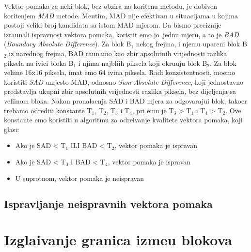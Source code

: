 Vektor pomaka za neki blok, bez obzira na kori\sh tenu metodu, je dobiven kori\sh tenjem \textit{MAD} metode. Me\dj utim, MAD nije efektivan u situacijama u kojima postoji veliki broj kandidata sa istom MAD mjerom.
Da bismo preciznije izra\ch unali ispravnost vektora pomaka, koristit \cj emo jo\sh\ jednu mjeru, a to je \textit{BAD} (\textit{Boundary Absolute Difference}). Za blok B$_1$ nekog frejma, i njemu upareni blok B$_2$ iz narednog
frejma, BAD ra\ch unamo kao zbir apsolutnih vrijednosti razlika piksela na ivici bloka B$_1$ i njima najbli\zh ih piksela koji okru\zh uju blok B$_2$. %
Za blok veli\ch ine 16x16 piksela, imat \cj emo 64 ivi\ch na piksela. Radi konzistentnosti, mo\zh emo koristiti \textit{SAD} umjesto MAD, odnosno \textit{Sum Absolute Difference}, koji jednostavno predstavlja ukupni zbir
apsolutnih vrijednosti razlika piksela, bez dijeljenja sa veli\ch inom bloka. Nakon pronala\zh enja SAD i BAD mjera za odgovaraju\cj i blok, tako\dj er trebamo odrediti konstante T$_1$, T$_2$, T$_3$ i T$_4$, pri \ch emu je T$_3$ > T$_1$ i T$_4$ > T$_2$. 
Ove konstante \cj emo koristiti u algoritmu za odre\dj ivanje kvalitete vektora pomaka, koji glasi:
\begin{itemize}
	\item Ako je SAD < T$_1$ ILI BAD < T$_2$, vektor pomaka je ispravan
	\item Ako je SAD < T$_3$ I BAD < T$_4$, vektor pomaka je ispravan
	\item U suprotnom, vektor pomaka je neispravan
\end{itemize}

\subsection{Ispravljanje neispravnih vektora pomaka}

\section{Izgla\dj ivanje granica izme\dj u blokova}